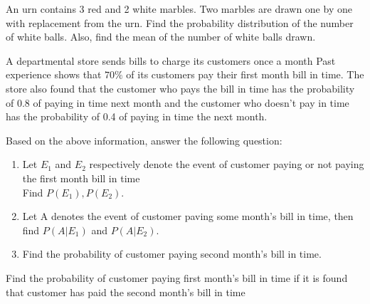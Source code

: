 \item An urn contains 3 red and 2 white marbles. Two marbles are drawn one by one with replacement from the urn. Find the probability distribution of the number of white balls. Also, find the mean of the number of white balls drawn.
\item A departmental store sends bills to charge its customers once a month Past experience shows that $ 70\% $ of its customers pay their first month bill in time. The store also found that the customer who pays the bill in time has the probability of 0.8 of paying in time next month and the customer who doesn't pay in time has the probability of 0.4 of paying in time the next month.

Based on the above information, answer the following question:
\begin{enumerate}
\item Let  $E_1$ and $E_2$ respectively denote the event of customer paying or not paying the first month bill in time\\
Find $P(E_1),P(E_2).$
\item Let A denotes the event of customer paving some month's bill in time, then find $P(A|E_1)$ and $P(A|E_2).$
\item Find the probability of customer paying second month's bill in time.
\end{enumerate}

\item Find the probability of customer paying first month's bill in time if it is found that customer has paid the second month's bill in time

